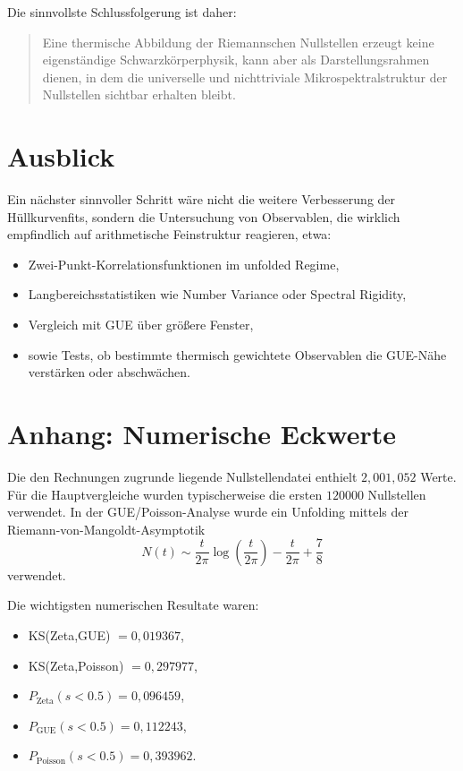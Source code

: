 \documentclass[11pt,a4paper]{article}
\theoremstyle{definition}
\theoremstyle{remark}
\begin{document}
	Die sinnvollste Schlussfolgerung ist daher:
	\begin{quote}
		Eine thermische Abbildung der Riemannschen Nullstellen erzeugt keine eigenständige Schwarzkörperphysik, kann aber als Darstellungsrahmen dienen, in dem die universelle und nichttriviale Mikrospektralstruktur der Nullstellen sichtbar erhalten bleibt.
	\end{quote}
	
	\section{Ausblick}
	
	Ein nächster sinnvoller Schritt wäre nicht die weitere Verbesserung der Hüllkurvenfits, sondern die Untersuchung von Observablen, die wirklich empfindlich auf arithmetische Feinstruktur reagieren, etwa:
	\begin{itemize}[leftmargin=1.5em]
		\item Zwei-Punkt-Korrelationsfunktionen im unfolded Regime,
		\item Langbereichsstatistiken wie Number Variance oder Spectral Rigidity,
		\item Vergleich mit GUE über größere Fenster,
		\item sowie Tests, ob bestimmte thermisch gewichtete Observablen die GUE-Nähe verstärken oder abschwächen.
	\end{itemize}
	
	\section*{Anhang: Numerische Eckwerte}
	
	Die den Rechnungen zugrunde liegende Nullstellendatei enthielt $2{,}001{,}052$ Werte. Für die Hauptvergleiche wurden typischerweise die ersten $120000$ Nullstellen verwendet. In der GUE/Poisson-Analyse wurde ein Unfolding mittels der Riemann-von-Mangoldt-Asymptotik
	\[
	N(t)\sim \frac{t}{2\pi}\log\!\left(\frac{t}{2\pi}\right)-\frac{t}{2\pi}+\frac78
	\]
	verwendet.
	
	\vspace{1em}
	
	\noindent
	Die wichtigsten numerischen Resultate waren:
	\begin{itemize}[leftmargin=1.5em]
		\item KS(Zeta,GUE) $=0{,}019367$,
		\item KS(Zeta,Poisson) $=0{,}297977$,
		\item $P_{\text{Zeta}}(s<0.5)=0{,}096459$,
		\item $P_{\text{GUE}}(s<0.5)=0{,}112243$,
		\item $P_{\text{Poisson}}(s<0.5)=0{,}393962$.
	\end{itemize}
	
\end{document}
